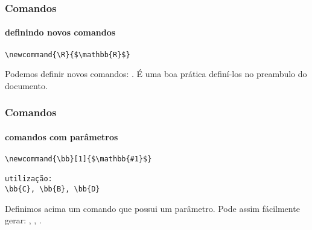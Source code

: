 \begin{frame}[fragile]
\frametitle{Comandos}
\framesubtitle{definindo novos comandos}

\begin{verbatim}
\newcommand{\R}{$\mathbb{R}$}
\end{verbatim}

Podemos definir novos comandos: \R.
É uma boa prática definí-los no preambulo do documento.

\end{frame}

\begin{frame}[fragile]
\frametitle{Comandos}
\framesubtitle{comandos com parâmetros}

\begin{verbatim}
\newcommand{\bb}[1]{$\mathbb{#1}$}

utilização:
\bb{C}, \bb{B}, \bb{D}
\end{verbatim}

Definimos acima um comando que possui um parâmetro.
Pode assim fácilmente gerar: , , .

\end{frame}

